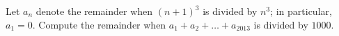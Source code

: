 Let $a_n$ denote the remainder when $(n+1)^3$ is divided by $n^3$; in particular, $a_1=0$.  Compute the remainder when $a_1+a_2+\dots+a_{2013}$ is divided by $1000$.
